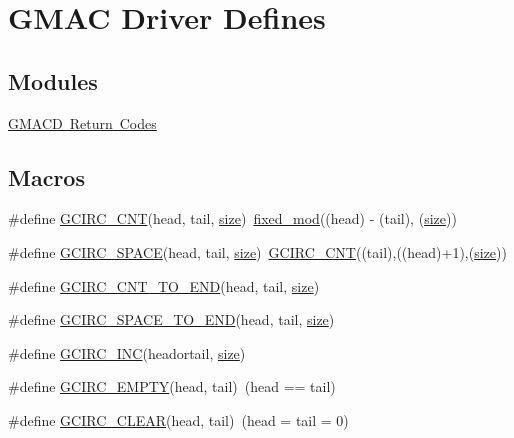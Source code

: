\hypertarget{group__gmacd__defines}{}\section{G\+M\+AC Driver Defines}
\label{group__gmacd__defines}
\subsection*{Modules}
\begin{DoxyCompactItemize}
\item 
\mbox{\hyperlink{group__gmacd__rc}{G\+M\+A\+C\+D Return Codes}}
\end{DoxyCompactItemize}
\subsection*{Macros}
\begin{DoxyCompactItemize}
\item 
\#define \mbox{\hyperlink{group__gmacd__defines_gaf979fcaac59bf6578901fc3fa40c7255}{G\+C\+I\+R\+C\+\_\+\+C\+NT}}(head,  tail,  \mbox{\hyperlink{sun4u_2tte_8h_a245260f6f74972558f61b85227df5aae}{size}})~\mbox{\hyperlink{group__gmacd__defines_gaf792223e30acf40b9e7a67f080f807e8}{fixed\+\_\+mod}}((head) -\/ (tail), (\mbox{\hyperlink{sun4u_2tte_8h_a245260f6f74972558f61b85227df5aae}{size}}))
\item 
\#define \mbox{\hyperlink{group__gmacd__defines_gad48958fa52a1e9dc9a08d33210bcd9e0}{G\+C\+I\+R\+C\+\_\+\+S\+P\+A\+CE}}(head,  tail,  \mbox{\hyperlink{sun4u_2tte_8h_a245260f6f74972558f61b85227df5aae}{size}})~\mbox{\hyperlink{group__gmacd__defines_gaf979fcaac59bf6578901fc3fa40c7255}{G\+C\+I\+R\+C\+\_\+\+C\+NT}}((tail),((head)+1),(\mbox{\hyperlink{sun4u_2tte_8h_a245260f6f74972558f61b85227df5aae}{size}}))
\item 
\#define \mbox{\hyperlink{group__gmacd__defines_gac9926ea92f8ad62f870aaf51552e3cd9}{G\+C\+I\+R\+C\+\_\+\+C\+N\+T\+\_\+\+T\+O\+\_\+\+E\+ND}}(head,  tail,  \mbox{\hyperlink{sun4u_2tte_8h_a245260f6f74972558f61b85227df5aae}{size}})
\item 
\#define \mbox{\hyperlink{group__gmacd__defines_ga41636c36b658013d2c0ff5e525a5af0e}{G\+C\+I\+R\+C\+\_\+\+S\+P\+A\+C\+E\+\_\+\+T\+O\+\_\+\+E\+ND}}(head,  tail,  \mbox{\hyperlink{sun4u_2tte_8h_a245260f6f74972558f61b85227df5aae}{size}})
\item 
\#define \mbox{\hyperlink{group__gmacd__defines_gafd62a355f7480b793be721ba4c754813}{G\+C\+I\+R\+C\+\_\+\+I\+NC}}(headortail,  \mbox{\hyperlink{sun4u_2tte_8h_a245260f6f74972558f61b85227df5aae}{size}})
\item 
\#define \mbox{\hyperlink{group__gmacd__defines_gafa316fca6188ee1324fca3acb10326a5}{G\+C\+I\+R\+C\+\_\+\+E\+M\+P\+TY}}(head,  tail)~(head == tail)
\item 
\#define \mbox{\hyperlink{group__gmacd__defines_ga65fb546208f7516e381b6535c899979a}{G\+C\+I\+R\+C\+\_\+\+C\+L\+E\+AR}}(head,  tail)~(head = tail = 0)
\end{DoxyCompactItemize}
